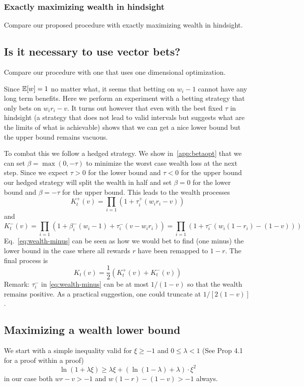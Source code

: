 \subsubsection{Exactly maximizing wealth in hindsight}
Compare our proposed procedure with exactly maximizing wealth in hindsight.
\subsection{Is it necessary to use vector bets?}
Compare our procedure with one that uses one dimensional optimization.

Since $\mathbb{E}[w]=1$ no matter what, it seems that betting  on $w_i-1$ 
cannot have any long term benefits. Here we perform an experiment with a 
betting strategy that only bets on $w_i r_i -v$. It turns out however that
even with the best fixed $\tau$ in hindsight (a strategy that does not lead 
to valid intervals but suggests what are the limits of what is achievable) 
shows that we can get a nice lower bound but the upper bound remains vacuous. 

To combat this we follow a hedged strategy. 
We show 
in~\ref{app:betaopt} that we can set $\beta=\max(0,-\tau)$ to minimize the worst case wealth loss at the next step.
Since we expect $\tau>0$ for the lower bound and $\tau<0$ 
for the upper bound our hedged strategy will 
split the wealth in 
half and set $\beta=0$ for the lower bound and $\beta=-\tau$ 
for the upper bound. This leads to the wealth processes
\[
K_t^+(v)=\prod_{i=1} (1+\tau^+_i (w_i r_i -v))
\]
and
\begin{equation}\label{eq:wealth-minus}
K_t^-(v)=\prod_{i=1} (1+\beta^-_i(w_i-1)+\tau^-_i (v-w_i r_i))
=\prod_{i=1} (1+\tau^-_i (w_i (1-r_i)-(1-v)))
\end{equation}
Eq.~\eqref{eq:wealth-minus} 
can be seen as how we would bet to find (one minus) the 
lower bound in the case where all rewards $r$ have been remapped 
to $1-r$. The final process is 
\[
K_t(v)=\frac{1}{2}(K_t^+(v)+K_t^-(v))
\]
Remark: $\tau^-_i$ in \eqref{eq:wealth-minus} can be at most $1/(1-v)$ so that the wealth remains positive. As a practical suggestion, one could truncate at $1/[2(1-v)]$.

\subsection{Maximizing a wealth lower bound}

We start with a simple inequality valid for $\xi\geq-1$ and 
$0\leq \lambda < 1$ (See \cite{fan2015exponential} Prop 4.1 for a proof within a proof)
\begin{equation}
\ln(1+\lambda \xi) \geq \lambda \xi+\left(\ln\left(1-\lambda\right)+\lambda\right)\cdot \xi^{2}
\label{eq:fanbound}
\end{equation}
in our case both $wr-v>-1$ and $w(1-r)-(1-v)>-1$ always.

